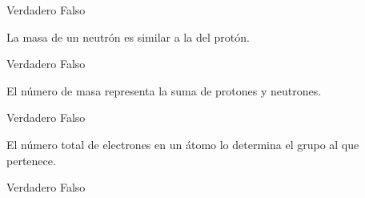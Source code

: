 \begin{multicols}{2}
\begin{parts}
        \begin{oneparcheckboxes}
            \choice Verdadero
            \CorrectChoice Falso
        \end{oneparcheckboxes}
        La masa de un neutrón es similar a la del protón.

        \begin{oneparcheckboxes}
            \CorrectChoice Verdadero
            \choice Falso
        \end{oneparcheckboxes}



        El número de masa representa la suma de protones y neutrones.

        \begin{oneparcheckboxes}
            \CorrectChoice Verdadero
            \choice Falso
        \end{oneparcheckboxes}

        El número total de electrones en un átomo lo determina el grupo al que pertenece.

        \begin{oneparcheckboxes}
            \choice Verdadero
            \CorrectChoice Falso
        \end{oneparcheckboxes}

    \end{parts}
\end{multicols}
